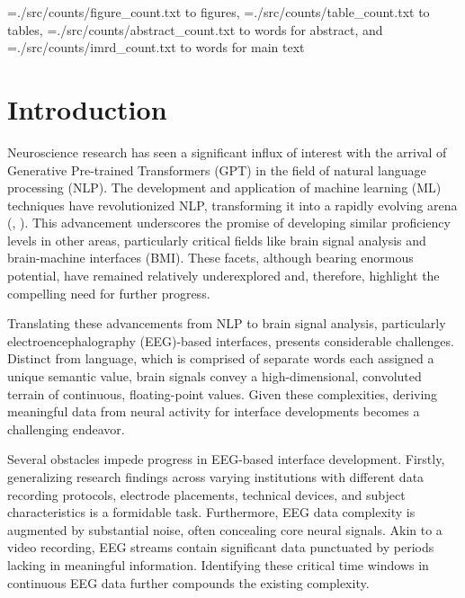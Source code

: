 \documentclass[final,3p,times,twocolumn]{elsarticle}
\newcommand\readwordcount[1]{%
  \openin\wordcount=#1
  \read\wordcount to \thewordcount
  \closein\wordcount
  \thewordcount
}
\begin{document}
\begin{wordcount*}
\readwordcount{./src/counts/figure_count.txt} figures, \readwordcount{./src/counts/table_count.txt} tables, \readwordcount{./src/counts/abstract_count.txt} words for abstract, and \readwordcount{./src/counts/imrd_count.txt} words for main text
\end{wordcount*}

\section{Introduction}
Neuroscience research has seen a significant influx of interest with the arrival of Generative Pre-trained Transformers (GPT) in the field of natural language processing (NLP). The development and application of machine learning (ML) techniques have revolutionized NLP, transforming it into a rapidly evolving arena (\cite{NIPS2017_3f5ee243}, \cite{radford_language_nodate}). This advancement underscores the promise of developing similar proficiency levels in other areas, particularly critical fields like brain signal analysis and brain-machine interfaces (BMI). These facets, although bearing enormous potential, have remained relatively underexplored and, therefore, highlight the compelling need for further progress.

Translating these advancements from NLP to brain signal analysis, particularly electroencephalography (EEG)-based interfaces, presents considerable challenges. Distinct from language, which is comprised of separate words each assigned a unique semantic value, brain signals convey a high-dimensional, convoluted terrain of continuous, floating-point values. Given these complexities, deriving meaningful data from neural activity for interface developments becomes a challenging endeavor.

Several obstacles impede progress in EEG-based interface development. Firstly, generalizing research findings across varying institutions with different data recording protocols, electrode placements, technical devices, and subject characteristics is a formidable task. Furthermore, EEG data complexity is augmented by substantial noise, often concealing core neural signals. Akin to a video recording, EEG streams contain significant data punctuated by periods lacking in meaningful information. Identifying these critical time windows in continuous EEG data further compounds the existing complexity.
\end{document}
